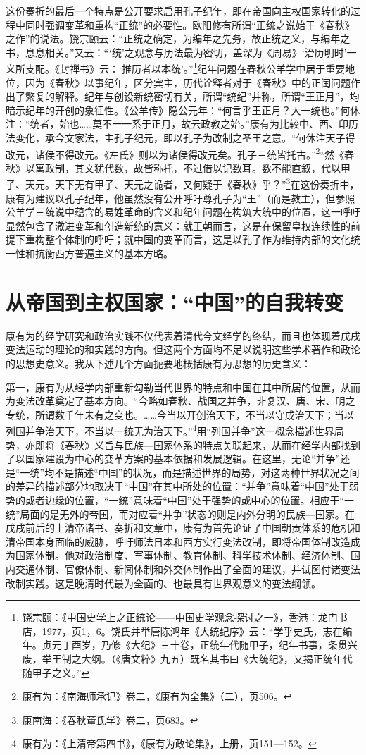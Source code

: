 \documentclass[a4paper, 12pt, openright]{ctexbook}
\begin{document}
这份奏折的最后一个特点是公开要求启用孔子纪年，即在帝国向主权国家转化的过程中同时强调变革和重构“正统”的必要性。欧阳修有所谓“正统之说始于《春秋》之作”的说法。饶宗颐云：“正统之确定，为编年之先务，故正统之义，与编年之书，息息相关。”又云：“‘统’之观念与历法最为密切，盖深为《周易》‘治历明时’一义所支配。《封禅书》云：‘推历者以本统’。”\footnote{饶宗颐：《中国史学上之正统论——中国史学观念探讨之一》，香港：龙门书店，1977，页1，6。饶氏并举唐陈鸿年《大统纪序》云：“学乎史氏，志在编年。贞元丁酉岁，乃修《大纪》三十卷，正统年代随甲子，纪年书事，条贯兴废，举王制之大纲。（《唐文粹》九五）既名其书曰《大统纪》，又揭正统年代随甲子之义。”}纪年问题在春秋公羊学中居于重要地位，因为《春秋》以事纪年，区分宾主，历代诠释者对于《春秋》中的正闰问题作出了繁复的解释。纪年与创设新统密切有关，所谓“统纪”并称，所谓“王正月”，均暗示纪年的开创的象征性。《公羊传》隐公元年：“何言乎王正月？大一统也。”何休注：“统者，始也……莫不一一系于正月，故云政教之始。”康有为比较中、西、印历法变化，承今文家法，主孔子纪元，即以孔子为改制之圣王之意。“何休注天子得改元，诸侯不得改元。《左氏》则以为诸侯得改元矣。孔子三统皆托古。”\footnote{康有为：《南海师承记》卷二，《康有为全集》（二），页506。}“然《春秋》以寓政制，其文犹代数，故皆称托，不过借以记数耳。数不能直叙，代以甲子、天元。天下无有甲子、天元之诡者，又何疑于《春秋》乎？”\footnote{康南海：《春秋董氏学》卷二，页683。}在这份奏折中，康有为建议以孔子纪年，他虽然没有公开呼吁尊孔子为“王”（而是教主），但参照公羊学三统说中蕴含的易姓革命的含义和纪年问题在构筑大统中的位置，这一呼吁显然包含了激进变革和创造新统的意义：就王朝而言，这是在保留皇权连续性的前提下重构整个体制的呼吁；就中国的变革而言，这是以孔子作为维持内部的文化统一性和抗衡西方普遍主义的基本方略。

\section{从帝国到主权国家：“中国”的自我转变}

康有为的经学研究和政治实践不仅代表着清代今文经学的终结，而且也体现着戊戌变法运动的理论的和实践的方向。但这两个方面均不足以说明这些学术著作和政论的思想史意义。我从下述几个方面扼要地概括康有为思想的历史含义：

第一，康有为从经学内部重新勾勒当代世界的特点和中国在其中所居的位置，从而为变法改革奠定了基本方向。“今略如春秋、战国之并争，非复汉、唐、宋、明之专统，所谓数千年未有之变也。……今当以开创治天下，不当以守成治天下；当以列国并争治天下，不当以一统无为治天下。”\footnote{康有为：《上清帝第四书》，《康有为政论集》，上册，页151—152。}用“列国并争”这一概念描述世界局势，亦即将《春秋》义旨与民族—国家体系的特点关联起来，从而在经学内部找到了以国家建设为中心的变革方案的基本依据和发展逻辑。在这里，无论“并争”还是“一统”均不是描述“中国”的状况，而是描述世界的局势，对这两种世界状况之间的差异的描述部分地取决于“中国”在其中所处的位置：“并争”意味着“中国”处于弱势的或者边缘的位置，“一统”意味着“中国”处于强势的或中心的位置。相应于“一统”局面的是无外的帝国，而对应着“并争”状态的则是内外分明的民族—国家。在戊戌前后的上清帝诸书、奏折和文章中，康有为首先论证了中国朝贡体系的危机和清帝国本身面临的威胁，呼吁师法日本和西方实行变法改制，即将帝国体制改造成为国家体制。他对政治制度、军事体制、教育体制、科学技术体制、经济体制、国内交通体制、官僚体制、新闻体制和外交体制作出了全面的建议，并试图付诸变法改制实践。这是晚清时代最为全面的、也最具有世界观意义的变法纲领。
\end{document}
